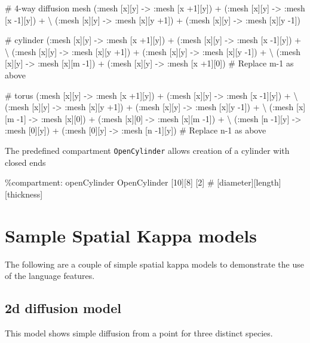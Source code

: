\begin{kappasource}

# 4-way diffusion mesh
    (:mesh [x][y] -> :mesh [x +1][y]) + (:mesh [x][y] -> :mesh [x -1][y]) + {\textbackslash}
    (:mesh [x][y] -> :mesh [x][y +1]) + (:mesh [x][y] -> :mesh [x][y -1])

# cylinder
    (:mesh [x][y] -> :mesh [x +1][y]) + (:mesh [x][y] -> :mesh [x -1][y]) + {\textbackslash}
    (:mesh [x][y] -> :mesh [x][y +1]) + (:mesh [x][y] -> :mesh [x][y -1]) + {\textbackslash}
    (:mesh [x][y] -> :mesh [x][m -1]) + (:mesh [x][y] -> :mesh [x +1][0]) 
# Replace m-1 as above 

# torus
    (:mesh [x][y] -> :mesh [x +1][y]) + (:mesh [x][y] -> :mesh [x -1][y]) + {\textbackslash}
    (:mesh [x][y] -> :mesh [x][y +1]) + (:mesh [x][y] -> :mesh [x][y -1]) + {\textbackslash}
    (:mesh [x][m -1] -> :mesh [x][0]) + (:mesh [x][0] -> :mesh [x][m -1]) + {\textbackslash}
    (:mesh [n -1][y] -> :mesh [0][y]) + (:mesh [0][y] -> :mesh [n -1][y])
# Replace n-1 as above 
\end{kappasource}

The predefined compartment \verb|OpenCylinder| allows creation of a cylinder with closed ends

\begin{kappasource}
\%compartment: openCylinder  OpenCylinder  [10][8] [2]    # [diameter][length] [thickness]
\end{kappasource}

\newpage
\section{Sample Spatial Kappa models}

The following are a couple of simple spatial kappa models to demonstrate the use of the language features.



\subsection{2d diffusion model}
\label{sec:2dDiffusion}

This model shows simple diffusion from a point for three distinct species.


